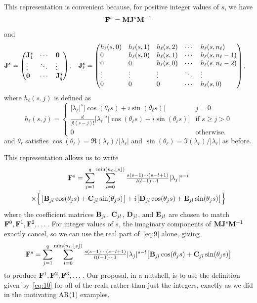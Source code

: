 \documentclass[AER,reviewmode]{tex/AEA}
\begin{document}
This representation is convenient because, for positive integer values
of $s$, we have
\[
\mathbf{F}^s = \mathbf{M} \mathbf{J}^s \mathbf{M}^{-1}
\]
and
\begin{align*}
\Jm^s =
\begin{pmatrix*}[l]
  \Jm_1^s  & \cdots & \Omat      \\
  \vdots & \ddots & \vdots \\
  \Omat      & \cdots & \Jm_q^s
\end{pmatrix*}, &&
\Jm_\ell^s &=
\begin{pmatrix*}[l]
  h_\ell(s,0) & h_\ell(s,1) & h_\ell(s,2) & \cdots & h_\ell(s,n_\ell)   \\
  0           & h_\ell(s,0) & h_\ell(s,1) & \cdots & h_\ell(s,n_\ell-1) \\
  0           & 0           & h_\ell(s,0) & \cdots & h_\ell(s,n_\ell-2) \\
  \vdots      & \vdots      & \vdots      & \ddots & \vdots             \\
  0           & 0           & 0           & \cdots & h_\ell(s,0)        \\
\end{pmatrix*},
\end{align*}
  where $h_\ell(s,j)$ is defined as
\begin{equation*}
h_\ell(s,j) =
\begin{cases}
  |\lambda_\ell|^s \big[\cos(\theta_\ell s) + i \sin(\theta_\ell s)\big] & j = 0 \\
  \frac{s!}{j!(s-j)!} |\lambda_\ell|^s \big[\cos(\theta_\ell s) + i \sin(\theta_\ell s)\big] & \text{if } s \geq j > 0 \\
  0 & \text{otherwise.}
\end{cases}
\end{equation*}
and $\theta_\ell$ satisfies
$\cos(\theta_\ell) = \Re(\lambda_\ell)/|\lambda_\ell|$ and
$\sin(\theta_\ell) = \Im(\lambda_\ell)/|\lambda_\ell|$ as before.

This representation allows us to write
\begin{multline}
  \label{eq:9}
  \mathbf{F}^s =
  \sum_{j = 1}^q \sum_{l=0}^{\min(n_\ell, \lfloor s\rfloor)} \tfrac{s(s-1)\cdots(s-l+1)}{l (l - 1) \cdots 1} |\lambda_j|^{s-l} \\
  \times\Big\{\big[\mathbf{B}_{jl} \cos(\theta_j s) + \mathbf{C}_{jl} \sin(\theta_j s)\big] + i\big[\mathbf{D}_{jl} \cos(\theta_j s) + \mathbf{E}_{jl} \sin(\theta_j s)\big]\Big\}
\end{multline}
where the coefficient matrices $\mathbf{B}_{jl}$, $\mathbf{C}_{jl}$, $\mathbf{D}_{jl}$, and
$\mathbf{E}_{jl}$ are chosen to match $\mathbf{F}^0, \mathbf{F}^1, \mathbf{F}^2,\dots$. For integer
values of $s$, the imaginary components of $\mathbf{M} \mathbf{J}^s \mathbf{M}^{-1}$ exactly
cancel, so we can use the real part of~\eqref{eq:9} alone, giving
\begin{equation}
  \label{eq:10}
  \mathbf{F}^s =
  \sum_{j = 1}^q \sum_{l=0}^{\min(n_\ell, \lfloor s \rfloor)} \tfrac{s(s-1)\cdots(s-l+1)}{l (l - 1) \cdots 1} |\lambda_j|^{s-l} \big[\mathbf{B}_{jl} \cos(\theta_j s) + \mathbf{C}_{jl} \sin(\theta_j s)\big]
\end{equation}
to produce $\mathbf{F}^1, \mathbf{F}^2, \mathbf{F}^3,\dots$. Our proposal, in a nutshell, is to
use the definition given by~\eqref{eq:10} for all of the reals rather
than just the integers, exactly as we did in the motivating AR(1)
examples.
\end{document}
